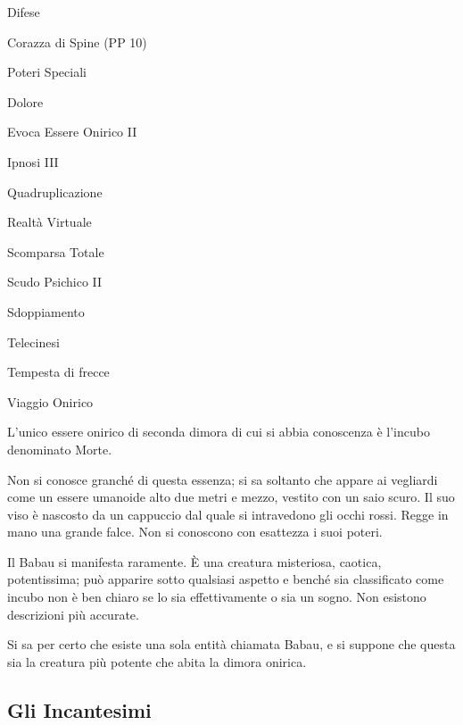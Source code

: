 \begin{parmostro}{Difese}
\item Corazza di Spine (PP 10)
\end{parmostro}

\begin{parmostro}{Poteri Speciali}
\item Dolore
\item Evoca Essere Onirico II
\item Ipnosi III
\item Quadruplicazione
\item Realt\`a Virtuale
\item Scomparsa Totale
\item Scudo Psichico II
\item Sdoppiamento
\item Telecinesi
\item Tempesta di frecce
\item Viaggio Onirico
\end{parmostro}


L'unico essere onirico di seconda dimora di cui si abbia conoscenza
\`e l'incubo denominato Morte.

Non si conosce granch\'e di questa essenza; si sa soltanto che appare ai
vegliardi come un essere umanoide alto due metri e mezzo, vestito con
un saio scuro. Il suo viso \`e nascosto da un cappuccio dal quale si
intravedono gli occhi rossi. Regge in mano una grande falce. Non si
conoscono con esattezza i suoi poteri.



Il Babau si manifesta raramente. \`E una creatura misteriosa, caotica,
potentissima; pu\`o apparire sotto qualsiasi aspetto e bench\'e sia
classificato come incubo non \`e ben chiaro se lo sia effettivamente
o sia un sogno.  Non esistono descrizioni pi\`u accurate.

Si sa per certo che esiste una sola entit\`a chiamata Babau, e si
suppone che questa sia la creatura pi\`u potente che abita la dimora
onirica.

\subsection{Gli Incantesimi}
\label{incillusionismo}


\vspace{12cm}\vfill\vfill{}

